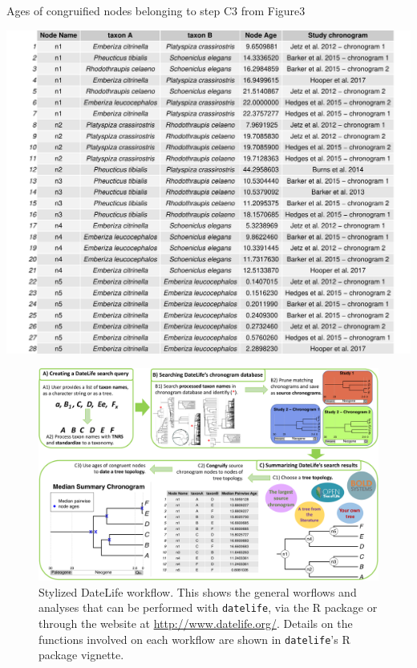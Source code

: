 \documentclass[
  english,
  man]{apa6}
\begin{document}
\begin{table}
  \caption{Ages of congruified nodes belonging to step C3 from Figure3}
  \label{tbl:table1}
  \includegraphics[width=\linewidth]{../tables/table-fringillidae-small-example.pdf}
\end{table}


\begin{figure}[!h]
\includegraphics{../figures/figure1/figure1-new.pdf}
\caption{Stylized DateLife workflow. This shows the general worflows and analyses that can be performed with \texttt{datelife}, via the R package or through the website  at \url{http://www.datelife.org/}. Details on the functions involved on each workflow are shown in \texttt{datelife}'s R package vignette.
}
\label{fig:workflow}
\end{figure}
\end{document}
